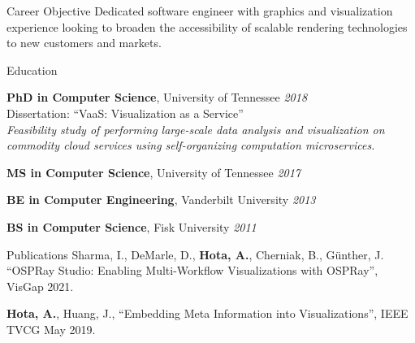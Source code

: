 \documentclass{resume} %
\begin{document}
\begin{multicols}{2}


\begin{rSection}{Career Objective}
  Dedicated software engineer with graphics and visualization experience looking to
  broaden the accessibility of scalable rendering technologies to new customers and
  markets.
\end{rSection}


\begin{rSection}{Education}

{{\bf PhD in Computer Science}, University of Tennessee} \hfill {\em 2018} \\ 
Dissertation: ``VaaS: Visualization as a Service''\\
  \emph{Feasibility study of performing large-scale data analysis and visualization on
  commodity cloud services using self-organizing computation microservices.}

{{\bf MS in Computer Science}, University of Tennessee} \hfill {\em 2017}

{{\bf BE in Computer Engineering}, Vanderbilt University} \hfill {\em 2013}

{{\bf BS in Computer Science}, Fisk University} \hfill {\em 2011}

\end{rSection}

\vfill\null
\columnbreak


\begin{rSection}{Publications}
  Sharma, I., DeMarle, D., \textbf{Hota, A.}, Cherniak, B., Günther, J. ``OSPRay Studio: Enabling Multi-Workflow Visualizations with OSPRay'', VisGap 2021. \href{https://doi.org/10.2312/visgap.20211086}{\faLink}

  \textbf{Hota, A.}, Huang, J., ``Embedding Meta Information into Visualizations'', IEEE TVCG May 2019. \href{https://doi.org/10.1109/TVCG.2019.2916098}{\faLink}


\end{rSection}
\end{multicols}
\end{document}
